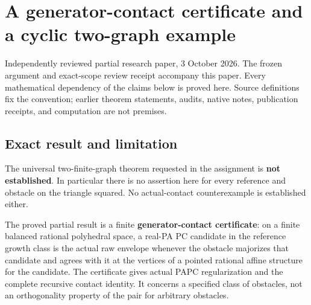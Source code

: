 \documentclass[
  10pt,
]{article}
\author{}
\date{}
\begin{document}
\section{A generator-contact certificate and a cyclic two-graph
example}\label{a-generator-contact-certificate-and-a-cyclic-two-graph-example}

Independently reviewed partial research paper, 3 October 2026. The
frozen argument and exact-scope review receipt accompany this paper. Every mathematical dependency
of the claims below is proved here. Source definitions fix the
convention; earlier theorem statements, audits, native notes,
publication receipts, and computation are not premises.

\subsection{Exact result and
limitation}\label{exact-result-and-limitation}

The universal two-finite-graph theorem requested in the assignment is
\textbf{not established}. In particular there is no assertion here for
every reference and obstacle on the triangle squared. No actual-contact
counterexample is established either.

The proved partial result is a finite \textbf{generator-contact
certificate}: on a finite balanced rational polyhedral space, a real-PA
PC candidate in the reference growth class is the actual raw envelope
whenever the obstacle majorizes that candidate and agrees with it at the
vertices of a pointed rational affine structure for the candidate. The
certificate gives actual PAPC regularization and the complete recursive
contact identity. It concerns a specified class of obstacles, not an
orthogonality property of the pair for arbitrary obstacles.
\end{document}
